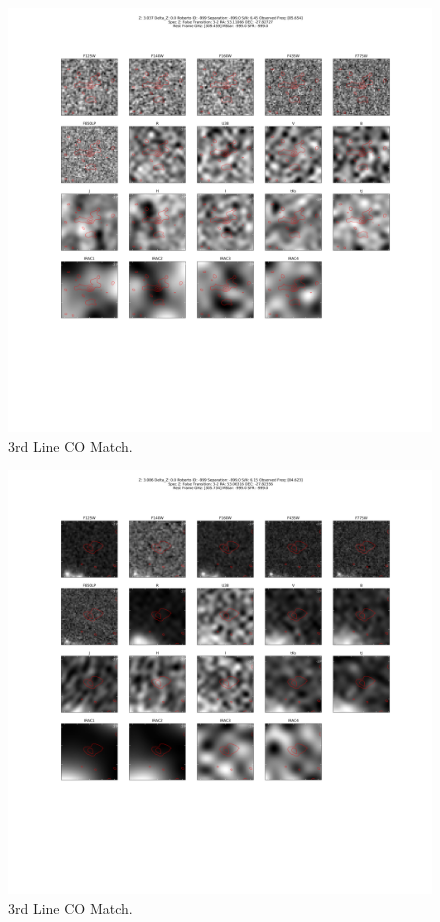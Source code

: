 \begin{figure}[tbp]
\centering \includegraphics[width=120mm]{Matched/ASPECS_Cutout_25.png}
\caption{3rd Line CO Match.}
\label{fig:Match_Three}
\end{figure}

\begin{figure}[tbp]
\centering \includegraphics[width=120mm]{Matched/ASPECS_Cutout_26.png}
\caption{3rd Line CO Match.}
\label{fig:Match_Three}
\end{figure}


